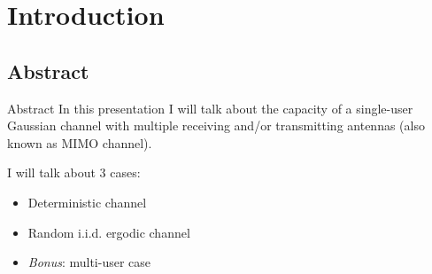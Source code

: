 \section{Introduction}

\subsection{Abstract}
\begin{frame}{Abstract}
In this presentation I will talk about the capacity of a single-user Gaussian channel with multiple receiving and/or transmitting antennas (also known as \alert{MIMO} channel).

\myspace
I will talk about 3 cases:
\begin{itemize}
	\item Deterministic channel
	\item Random i.i.d. ergodic channel
	\item \textit{Bonus}: multi-user case
\end{itemize}

\end{frame}

